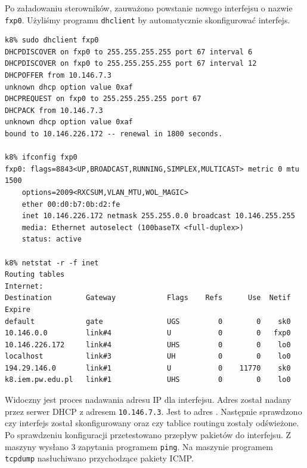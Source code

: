 Po załadowaniu sterowników, zauważono powstanie nowego interfejsu o nazwie
\texttt{fxp0}. Użyliśmy programu \texttt{dhclient} by automatycznie
skonfigurować interfejs.

\begin{lstlisting}
k8% sudo dhclient fxp0
DHCPDISCOVER on fxp0 to 255.255.255.255 port 67 interval 6
DHCPDISCOVER on fxp0 to 255.255.255.255 port 67 interval 12
DHCPOFFER from 10.146.7.3
unknown dhcp option value 0xaf
DHCPREQUEST on fxp0 to 255.255.255.255 port 67
DHCPACK from 10.146.7.3
unknown dhcp option value 0xaf
bound to 10.146.226.172 -- renewal in 1800 seconds.

k8% ifconfig fxp0
fxp0: flags=8843<UP,BROADCAST,RUNNING,SIMPLEX,MULTICAST> metric 0 mtu 1500
    options=2009<RXCSUM,VLAN_MTU,WOL_MAGIC>
    ether 00:d0:b7:0b:d2:fe
    inet 10.146.226.172 netmask 255.255.0.0 broadcast 10.146.255.255
    media: Ethernet autoselect (100baseTX <full-duplex>)
    status: active

k8% netstat -r -f inet
Routing tables
Internet:
Destination        Gateway            Flags    Refs      Use  Netif Expire
default            gate               UGS         0        0    sk0
10.146.0.0         link#4             U           0        0   fxp0
10.146.226.172     link#4             UHS         0        0    lo0
localhost          link#3             UH          0        0    lo0
194.29.146.0       link#1             U           0    11770    sk0
k8.iem.pw.edu.pl   link#1             UHS         0        0    lo0
\end{lstlisting}

Widoczny jest proces nadawania adresu IP dla interfejsu. Adres został nadany
przez serwer DHCP z adresem \texttt{10.146.7.3}. Jest to adres \volt. Następnie
sprawdzono czy interfejs został skonfigurowany oraz czy tablice routingu zostały
odświeżone. Po sprawdzeniu konfiguracji przetestowano przepływ pakietów do
interfejsu. Z maszyny \volt{} wysłano 3 zapytania programem \texttt{ping}. Na
maszynie \kosiem{} programem \texttt{tcpdump} nasłuchiwano przychodzące pakiety
ICMP.

